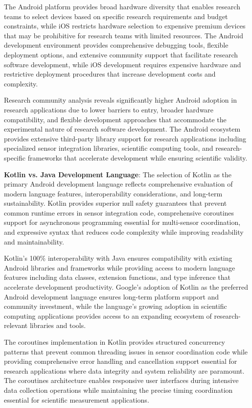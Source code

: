 \documentclass[11pt,a4paper]{report}
\begin{document}
The Android platform provides broad hardware diversity that enables research teams to select devices based on specific research requirements and budget constraints, while iOS restricts hardware selection to expensive premium devices that may be prohibitive for research teams with limited resources. The Android development environment provides comprehensive debugging tools, flexible deployment options, and extensive community support that facilitate research software development, while iOS development requires expensive hardware and restrictive deployment procedures that increase development costs and complexity.

Research community analysis reveals significantly higher Android adoption in research applications due to lower barriers to entry, broader hardware compatibility, and flexible development approaches that accommodate the experimental nature of research software development. The Android ecosystem provides extensive third-party library support for research applications including specialized sensor integration libraries, scientific computing tools, and research-specific frameworks that accelerate development while ensuring scientific validity.

\noindent \textbf{Kotlin vs. Java Development Language}: The selection of Kotlin as the primary Android development language reflects comprehensive evaluation of modern language features, interoperability considerations, and long-term sustainability. Kotlin provides superior null safety guarantees that prevent common runtime errors in sensor integration code, comprehensive coroutines support for asynchronous programming essential for multi-sensor coordination, and expressive syntax that reduces code complexity while improving readability and maintainability.

Kotlin's 100\% interoperability with Java ensures compatibility with existing Android libraries and frameworks while providing access to modern language features including data classes, extension functions, and type inference that accelerate development productivity. Google's adoption of Kotlin as the preferred Android development language ensures long-term platform support and community investment, while the language's growing adoption in scientific computing applications provides access to an expanding ecosystem of research-relevant libraries and tools.

The coroutines implementation in Kotlin provides structured concurrency patterns that prevent common threading issues in sensor coordination code while providing comprehensive error handling and cancellation support essential for research applications where data integrity and system reliability are paramount. The coroutines architecture enables responsive user interfaces during intensive data collection operations while maintaining the precise timing coordination essential for scientific measurement applications.
\end{document}
